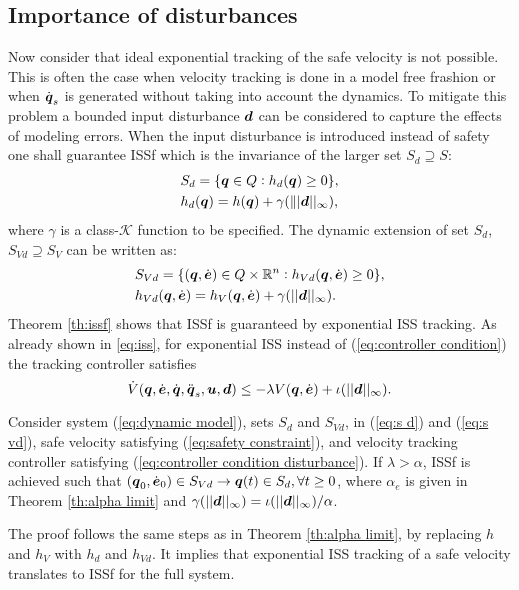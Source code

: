 \subsection{Importance of disturbances}\label{subsec:iod}
Now consider that ideal exponential tracking of the safe velocity is not possible. This is often the case when velocity tracking is done in a model free frashion or when $\dot{\boldsymbol{q}}_s$ is generated without taking into account the dynamics. To mitigate this problem a bounded input disturbance $\boldsymbol{d}$ can be considered to capture the effects of modeling errors. When the input disturbance is introduced instead of safety one shall guarantee ISSf which is the invariance of the larger set $S_d \supseteq S$:
\begin{equation} \label{eq:s d}
    \begin{split}
        &S_d = \{{\boldsymbol{q}} \in Q: h_d({\boldsymbol{q}})\geq 0 \},\\
        &h_d({\boldsymbol{q}})=h({\boldsymbol{q}}) + \gamma(\||\boldsymbol{d}||_\infty  ),
    \end{split}
\end{equation}
where $\gamma$ is a class-$\mathcal{K}$ function to be specified. 
The dynamic extension of set $S_d$, $S_{Vd}\supseteq S_{V}$ can be written as:
\begin{equation} \label{eq:s vd}
    \begin{split}
        &S_{Vd} = \{({\boldsymbol{q}},\dot{\boldsymbol{e}})\in Q \times \mathbb{R}^n: h_{Vd}({\boldsymbol{q}},\dot{\boldsymbol{e}})\geq 0\},\\
        &h_{Vd}({\boldsymbol{q}},\dot{\boldsymbol{e}}) = h_V({\boldsymbol{q}},\dot{\boldsymbol{e}})+\gamma(||\boldsymbol{d}||_\infty).
    \end{split}
\end{equation}
Theorem \ref{th:issf} shows that ISSf is guaranteed by exponential ISS tracking. %
As already shown in \eqref{eq:iss}, for exponential ISS instead of (\ref{eq:controller condition}) the tracking controller satisfies
\begin{equation} \label{eq:controller condition disturbance}
    \dot{V}({\boldsymbol{q}},\dot{\boldsymbol{e}},\dot{{\boldsymbol{q}}},\ddot{{\boldsymbol{q}}}_s,\boldsymbol{u},\boldsymbol{d}) \leq -\lambda V({\boldsymbol{q}},\dot{\boldsymbol{e}}) + \iota(||\boldsymbol{d}||_{\infty}).
\end{equation}
\begin{theorem}\label{th:issf}
    Consider system (\ref{eq:dynamic model}), sets $S_d$ and $S_{Vd}$, in (\ref{eq:s d}) and (\ref{eq:s vd}), safe velocity satisfying (\ref{eq:safety constraint}), and velocity tracking controller satisfying (\ref{eq:controller condition disturbance}). If $\lambda > \alpha$, ISSf is achieved such that $({\boldsymbol{q}}_0,\dot{\boldsymbol{e}}_0) \in S_{Vd} \rightarrow {\boldsymbol{q}}(t) \in S_d, \forall t \geq 0$, where $\alpha_e$ is given in Theorem \ref{th:alpha limit} and $\gamma(||\boldsymbol{d}||_\infty)=\iota(||\boldsymbol{d}||_\infty)/\alpha$.
\end{theorem}
\noindent
The proof follows the same steps as in Theorem \ref{th:alpha limit}, by replacing $h$ and $h_V$ with $h_d$ and $h_{Vd}$. It implies that exponential ISS tracking of a safe velocity translates to ISSf for the full system.
